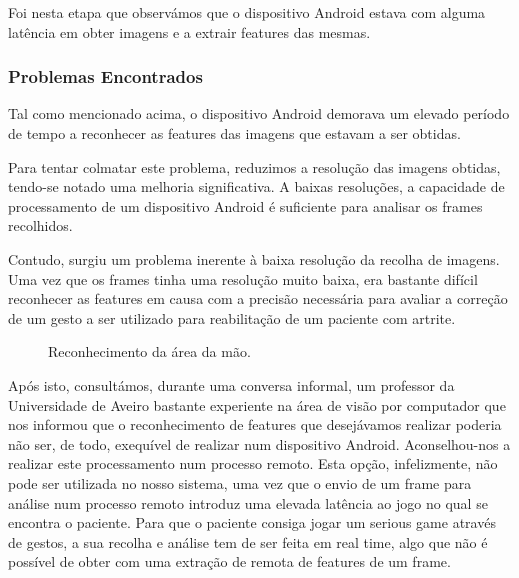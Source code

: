 \documentclass{TTUPhD}
\begin{document}
Foi nesta etapa que observámos que o dispositivo Android estava com alguma latência em obter imagens e a extrair features das mesmas.

\subsubsection{Problemas Encontrados}

Tal como mencionado acima, o dispositivo Android demorava um elevado período de tempo a reconhecer as features das imagens que estavam a ser obtidas.

Para tentar colmatar este problema, reduzimos a resolução das imagens obtidas, tendo-se notado uma melhoria significativa.
A baixas resoluções, a capacidade de processamento de um dispositivo Android é suficiente para analisar os frames recolhidos.

Contudo, surgiu um problema inerente à baixa resolução da recolha de imagens. Uma vez que os frames tinha uma resolução muito baixa,
era bastante difícil reconhecer as features em causa com a precisão necessária para avaliar a correção de um gesto a ser utilizado para reabilitação de um paciente com artrite.

\begin{figure}[h!]
    \center
    \caption{Reconhecimento da área da mão.}
    \label{fig:opencv2}
\end{figure}

Após isto, consultámos, durante uma conversa informal, um professor da Universidade de Aveiro bastante experiente na área de visão por computador
que nos informou que o reconhecimento de features que desejávamos realizar poderia não ser, de todo, exequível de realizar num dispositivo Android.
Aconselhou-nos a realizar este processamento num processo remoto. Esta opção, infelizmente, não pode ser utilizada no nosso sistema, uma vez que o
envio de um frame para análise num processo remoto introduz uma elevada latência ao jogo no qual se encontra o paciente. Para que o paciente consiga
jogar um serious game através de gestos, a sua recolha e análise tem de ser feita em real time, algo que não é possível de obter com uma extração de
remota de features de um frame.
\end{document}
